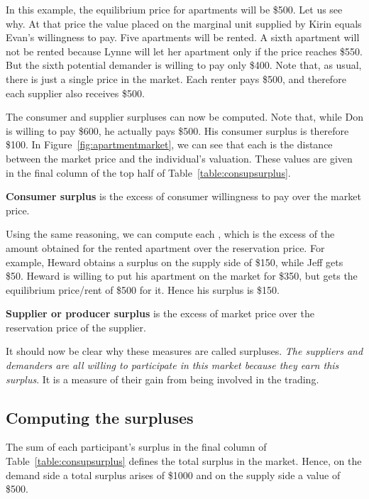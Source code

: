 In this example, the equilibrium price for apartments will be \$500. Let us see why. At that price the value placed on the marginal unit supplied by Kirin equals Evan's willingness to pay. Five apartments will be rented. A sixth apartment will not be rented because Lynne will let her apartment only if the price reaches \$550. But the sixth potential demander is willing to pay only \$400. Note that, as usual, there is just a single price in the market. Each renter pays \$500, and therefore each supplier also receives \$500.

The consumer and supplier surpluses can now be computed. Note that, while Don is willing to pay \$600, he actually pays \$500. His consumer surplus is therefore \$100. In Figure~\ref{fig:apartmentmarket}, we can see that each  is the distance between the market price and the individual's valuation. These values are given in the final column of the top half of Table~\ref{table:consupsurplus}.

\begin{DefBox}
\textbf{Consumer surplus} is the excess of consumer willingness to pay over the market price.
\end{DefBox}

Using the same reasoning, we can compute each , which is the excess of the amount obtained for the rented apartment over the reservation price. For example, Heward obtains a surplus on the supply side of \$150, while Jeff gets \$50. Heward is willing to put his apartment on the market for \$350, but gets the equilibrium price/rent of \$500 for it. Hence his surplus is \$150.

\begin{DefBox}
\textbf{Supplier or producer surplus} is the excess of market price over the reservation price of the supplier.
\end{DefBox}

It should now be clear why these measures are called surpluses. \textit{The suppliers and demanders are all willing to participate in this market because they earn this surplus}. It is a measure of their gain from being involved in the trading.

\subsection*{Computing the surpluses}

The sum of each participant's surplus in the final column of Table~\ref{table:consupsurplus} defines the total surplus in the market. Hence, on the demand side a total surplus arises of \$1000 and on the supply side a value of \$500.

